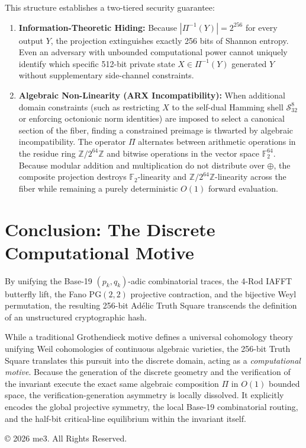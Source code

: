 \documentclass[11pt, a4paper]{article}
\begin{document}
This structure establishes a two-tiered security guarantee:
\begin{enumerate}
    \item \textbf{Information-Theoretic Hiding:} Because $|\Pi^{-1}(Y)| = 2^{256}$ for every output $Y$, the projection extinguishes exactly 256 bits of Shannon entropy. Even an adversary with unbounded computational power cannot uniquely identify which specific 512-bit private state $X \in \Pi^{-1}(Y)$ generated $Y$ without supplementary side-channel constraints.
    \item \textbf{Algebraic Non-Linearity (ARX Incompatibility):} When additional domain constraints (such as restricting $X$ to the self-dual Hamming shell $\mathcal{S}_{32}^8$ or enforcing octonionic norm identities) are imposed to select a canonical section of the fiber, finding a constrained preimage is thwarted by algebraic incompatibility. The operator $\Pi$ alternates between arithmetic operations in the residue ring $\mathbb{Z}/2^{64}\mathbb{Z}$ and bitwise operations in the vector space $\mathbb{F}_2^{64}$. Because modular addition and multiplication do not distribute over $\oplus$, the composite projection destroys $\mathbb{F}_2$-linearity and $\mathbb{Z}/2^{64}\mathbb{Z}$-linearity across the fiber while remaining a purely deterministic $O(1)$ forward evaluation.
\end{enumerate}

\section{Conclusion: The Discrete Computational Motive}

By unifying the Base-19 $(p_k, q_k)$-adic combinatorial traces, the 4-Rod IAFFT butterfly lift, the Fano $\mathrm{PG}(2,2)$ projective contraction, and the bijective Weyl permutation, the resulting 256-bit Ad\'{e}lic Truth Square transcends the definition of an unstructured cryptographic hash. 

While a traditional Grothendieck motive defines a universal cohomology theory unifying Weil cohomologies of continuous algebraic varieties, the 256-bit Truth Square translates this pursuit into the discrete domain, acting as a \textit{computational motive}. Because the generation of the discrete geometry and the verification of the invariant execute the exact same algebraic composition $\Pi$ in $O(1)$ bounded space, the verification-generation asymmetry is locally dissolved. It explicitly encodes the global projective symmetry, the local Base-19 combinatorial routing, and the half-bit critical-line equilibrium within the invariant itself.

© 2026 me3. All Rights Reserved.
\end{document}
